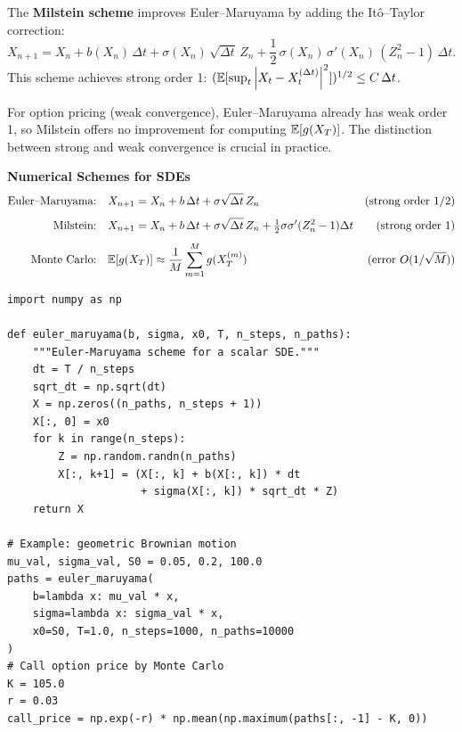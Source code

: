 \begin{definition}
The \textbf{Milstein scheme} improves Euler--Maruyama by adding the
It\^o--Taylor correction:
\[
  X_{n+1} = X_n + b(X_n)\,\Delta t + \sigma(X_n)\,\sqrt{\Delta t}\,Z_n
    + \frac{1}{2}\,\sigma(X_n)\,\sigma'(X_n)\,(Z_n^2 - 1)\,\Delta t.
\]
This scheme achieves strong order 1:
$(\mathbb{E}[\sup_t \left| X_t - X_t^{(\Delta t)} \right|^2])^{1/2} \leq C\,\Delta t$.
\end{definition}

\begin{attention}
For option pricing (weak convergence), Euler--Maruyama already has weak
order 1, so Milstein offers no improvement for computing $\mathbb{E}[g(X_T)]$.
The distinction between strong and weak convergence is crucial in
practice.
\end{attention}

\begin{keyformulas}
\textbf{Numerical Schemes for SDEs}
\begin{align*}
  \text{Euler--Maruyama:}\quad & X_{n+1} = X_n + b\,\Delta t
    + \sigma\sqrt{\Delta t}\,Z_n
    & \text{(strong order } 1/2\text{)} \\[4pt]
  \text{Milstein:}\quad & X_{n+1} = X_n + b\,\Delta t
    + \sigma\sqrt{\Delta t}\,Z_n
    + \tfrac{1}{2}\sigma\sigma'(Z_n^2-1)\Delta t
    & \text{(strong order } 1\text{)} \\[4pt]
  \text{Monte Carlo:}\quad & \mathbb{E}[g(X_T)] \approx \frac{1}{M}\sum_{m=1}^M
    g(X_T^{(m)})
    & \text{(error } O(1/\sqrt{M})\text{)}
\end{align*}
\end{keyformulas}

\begin{verbatim}
import numpy as np

def euler_maruyama(b, sigma, x0, T, n_steps, n_paths):
    """Euler-Maruyama scheme for a scalar SDE."""
    dt = T / n_steps
    sqrt_dt = np.sqrt(dt)
    X = np.zeros((n_paths, n_steps + 1))
    X[:, 0] = x0
    for k in range(n_steps):
        Z = np.random.randn(n_paths)
        X[:, k+1] = (X[:, k] + b(X[:, k]) * dt
                     + sigma(X[:, k]) * sqrt_dt * Z)
    return X

# Example: geometric Brownian motion
mu_val, sigma_val, S0 = 0.05, 0.2, 100.0
paths = euler_maruyama(
    b=lambda x: mu_val * x,
    sigma=lambda x: sigma_val * x,
    x0=S0, T=1.0, n_steps=1000, n_paths=10000
)
# Call option price by Monte Carlo
K = 105.0
r = 0.03
call_price = np.exp(-r) * np.mean(np.maximum(paths[:, -1] - K, 0))
\end{verbatim}

